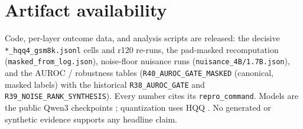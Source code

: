 \documentclass{article}
\begin{document}
\section*{Artifact availability}
Code, per-layer outcome data, and analysis scripts are released: the decisive
\texttt{*\_hqq4\_\allowbreak gsm8k.jsonl} cells and r120 re-runs, the pad-masked recomputation
(\texttt{masked\_\allowbreak from\_\allowbreak log.json}), noise-floor nuisance runs
(\texttt{nuisance\_\allowbreak 4B/1.7B.json}), and the AUROC / robustness tables
(\texttt{R40\_\allowbreak AUROC\_\allowbreak GATE\_\allowbreak MASKED} (canonical, masked labels)
with the historical \texttt{R38\_\allowbreak AUROC\_\allowbreak GATE} and
\texttt{R39\_\allowbreak NOISE\_\allowbreak RANK\_\allowbreak SYNTHESIS}).
Every number cites its \texttt{repro\_command}. Models are the public Qwen3 checkpoints
\citep{yang2025qwen3}; quantization uses HQQ \citep{badri2023hqq}. No generated or synthetic
evidence supports any headline claim.

\label{p5:main-text-end}




\end{document}
